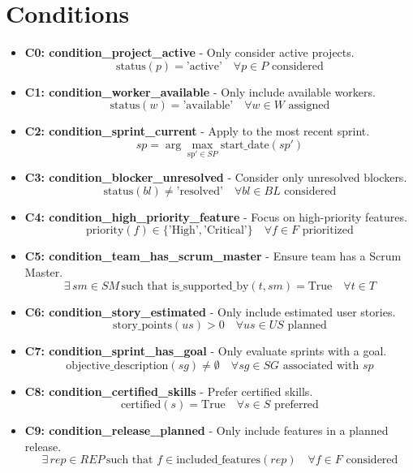 \documentclass[11pt]{article}
\begin{document}
\section{Conditions}
\begin{itemize}
    \item \textbf{C0: condition\_project\_active} - Only consider active projects.
        \[ \text{status}(p) = \text{'active'} \quad \forall p \in P \text{ considered} \]
    \item \textbf{C1: condition\_worker\_available} - Only include available workers.
        \[ \text{status}(w) = \text{'available'} \quad \forall w \in W \text{ assigned} \]
    \item \textbf{C2: condition\_sprint\_current} - Apply to the most recent sprint.
        \[ sp = \arg\max_{\text{sp}' \in SP} \text{start\_date}(sp') \]
    \item \textbf{C3: condition\_blocker\_unresolved} - Consider only unresolved blockers.
        \[ \text{status}(bl) \neq \text{'resolved'} \quad \forall bl \in BL \text{ considered} \]
    \item \textbf{C4: condition\_high\_priority\_feature} - Focus on high-priority features.
        \[ \text{priority}(f) \in \{\text{'High'}, \text{'Critical'}\} \quad \forall f \in F \text{ prioritized} \]
    \item \textbf{C5: condition\_team\_has\_scrum\_master} - Ensure team has a Scrum Master.
        \[ \exists \, sm \in SM \, \text{such that } \text{is\_supported\_by}(t, sm) = \text{True} \quad \forall t \in T \]
    \item \textbf{C6: condition\_story\_estimated} - Only include estimated user stories.
        \[ \text{story\_points}(us) > 0 \quad \forall us \in US \text{ planned} \]
    \item \textbf{C7: condition\_sprint\_has\_goal} - Only evaluate sprints with a goal.
        \[ \text{objective\_description}(sg) \neq \emptyset \quad \forall sg \in SG \text{ associated with } sp \]
    \item \textbf{C8: condition\_certified\_skills} - Prefer certified skills.
        \[ \text{certified}(s) = \text{True} \quad \forall s \in S \text{ preferred} \]
    \item \textbf{C9: condition\_release\_planned} - Only include features in a planned release.
        \[ \exists \, rep \in REP \, \text{such that } f \in \text{included\_features}(rep) \quad \forall f \in F \text{ considered} \]
\end{itemize}
\end{document}
